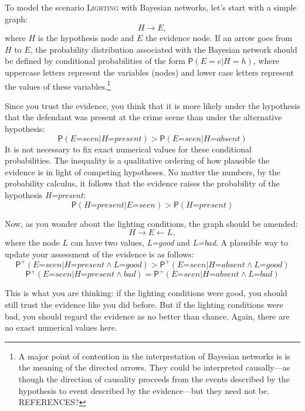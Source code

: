 \documentclass[
  11pt,
  dvipsnames,enabledeprecatedfontcommands]{scrartcl}
\newcommand{\pr}[1]{\ensuremath{\mathsf{P}(#1)}}
\newcommand{\ppr}[2]{\ensuremath{\mathsf{P}^{#1}(#2)}}
\begin{document}
To model the scenario \textsc{Lighting} with Bayesian networks, let's
start with a simple graph: \[H \rightarrow E,\] where \(H\) is the
hypothesis node and \(E\) the evidence node. If an arrow goes from \(H\)
to \(E\), the probability distribution associated with the Bayesian
network should be defined by conditional probabilities of the form
\(\pr{E=e \vert H=h}\), where uppercase letters represent the variables
(nodes) and lower case letters represent the values of these
variables.\footnote{A major point of contention in the interpretation of
  Bayesian networks is is the meaning of the directed arrows. They could
  be interpreted causally---as though the direction of causality
  proceeds from the events described by the hypothesis to event
  described by the evidence---but they need not be. REFERENCES?}

Since you trust the evidence, you think that it is more likely under the
hypothesis that the defendant was present at the crime scene than under
the alternative hypothesis:
\[\pr{\textit{E=seen} \vert \textit{H=present}} > \pr{\textit{E=seen} \vert \textit{H=absent}}\]
It is not necessary to fix exact numerical values for these conditional
probabilities. The inequality is a qualitative ordering of how plausible
the evidence is in light of competing hypotheses. No matter the numbers,
by the probability calculus, it follows that the evidence raises the
probability of the hypothesis \textit{H=present}:
\[\pr{\textit{H=present}\vert \textit{E=seen}} > \pr{\textit{H=present}}\]

\noindent Now, as you wonder about the lighting conditions, the graph
should be amended: \[H \rightarrow E \leftarrow L,\] where the node
\(L\) can have two values, \textit{L=good} and \textit{L=bad}. A
plausible way to update your assessment of the evidence is as follows:
\[\ppr{+}{\textit{E=seen} \vert \textit{H=present} \wedge \textit{L=good}} > \ppr{+}{\textit{E=seen} \vert \textit{H=absent} \wedge \textit{L=good}}\]
\[\ppr{+}{\textit{E=seen} \vert \textit{H=present} \wedge \textit{bad}} = \ppr{+}{\textit{E=seen} \vert \textit{H=absent} \wedge \textit{L=bad}}\]

\noindent This is what you are thinking: if the lighting conditions were
good, you should still trust the evidence like you did before. But if
the lighting conditions were bad, you should regard the evidence as no
better than chance. Again, there are no exact numerical values here.
\end{document}
